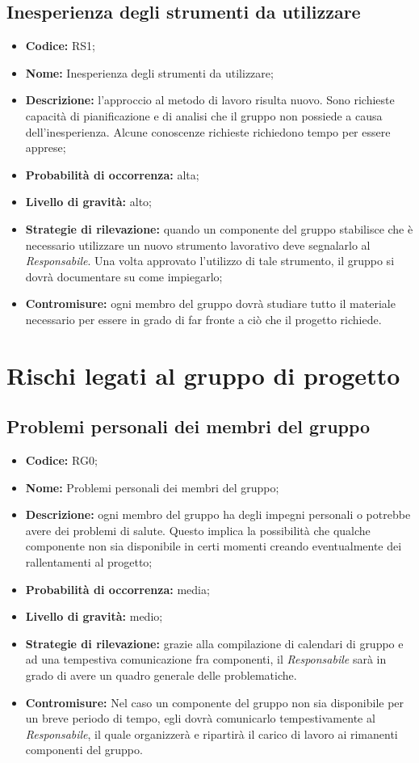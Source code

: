 \documentclass[./PianodiProgetto.tex]{subfiles}
\begin{document}
\subsection{Inesperienza degli strumenti da utilizzare}
\begin{itemize}
	\item \textbf{Codice:} RS1;
	\item \textbf{Nome:} Inesperienza degli strumenti da utilizzare;
	\item \textbf{Descrizione:} l'approccio al metodo di lavoro risulta nuovo. Sono richieste capacità di pianificazione e di analisi che il gruppo non possiede a causa dell'inesperienza. Alcune conoscenze richieste richiedono tempo per essere apprese;
	\item \textbf{Probabilità di occorrenza:} alta;
	\item \textbf{Livello di gravità:} alto;
	\item \textbf{Strategie di rilevazione:} quando un componente del gruppo stabilisce che è necessario utilizzare un nuovo strumento lavorativo deve segnalarlo al  \textit{Responsabile}. Una volta approvato l'utilizzo di tale strumento, il gruppo si dovrà documentare su come impiegarlo;
	\item \textbf{Contromisure:} ogni membro del gruppo dovrà studiare tutto il materiale necessario per essere in grado di far fronte  a ciò che il progetto richiede.
\end{itemize}

\section{Rischi legati al gruppo di progetto}
\subsection{Problemi personali dei membri del gruppo}
\begin{itemize}
	\item \textbf{Codice:} RG0;
	\item \textbf{Nome:} Problemi personali dei membri del gruppo;
	\item \textbf{Descrizione:} ogni membro del gruppo ha degli impegni personali o potrebbe avere dei problemi di salute. Questo implica la possibilità che qualche componente non sia disponibile in certi momenti creando eventualmente dei rallentamenti al progetto;
	\item \textbf{Probabilità di occorrenza:} media;
	\item \textbf{Livello di gravità:} medio;
	\item \textbf{Strategie di rilevazione:} grazie alla compilazione di calendari di gruppo e ad una tempestiva comunicazione fra componenti, il \textit{Responsabile} sarà in grado di avere un quadro generale delle problematiche.
	\item \textbf{Contromisure:} Nel caso un componente del gruppo non sia disponibile per un breve periodo di tempo, egli dovrà comunicarlo tempestivamente al \textit{Responsabile}, il quale organizzerà e ripartirà il carico di lavoro ai rimanenti componenti del gruppo. 
\end{itemize}
\end{document}
